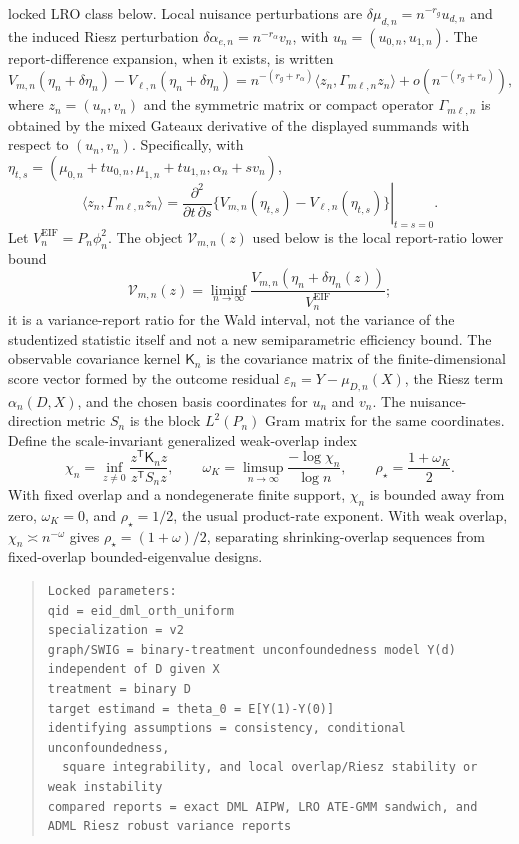 \documentclass[11pt]{article}
\newcommand{\transpose}{\mathsf{T}}
\theoremstyle{definition}
\theoremstyle{plain}
\theoremstyle{remark}
\begin{document}
locked LRO class below.  Local nuisance perturbations are
\(\delta\mu_{d,n}=n^{-r_g}u_{d,n}\) and the induced Riesz perturbation
\(\delta\alpha_{e,n}=n^{-r_\alpha}v_n\), with
\(u_n=(u_{0,n},u_{1,n})\).  The
report-difference expansion, when it exists, is written
\[
V_{m,n}(\eta_n+\delta\eta_n)-V_{\ell,n}(\eta_n+\delta\eta_n)
= n^{-(r_g+r_\alpha)}
  \langle z_n,\Gamma_{m\ell,n}z_n\rangle + o(n^{-(r_g+r_\alpha)}),
\]
where \(z_n=(u_n,v_n)\) and the symmetric matrix or compact operator
\(\Gamma_{m\ell,n}\) is obtained by the mixed Gateaux derivative of the
displayed summands with respect to \((u_n,v_n)\).  Specifically, with
\(\eta_{t,s}=(\mu_{0,n}+tu_{0,n},\mu_{1,n}+tu_{1,n},
\alpha_n+sv_n)\),
\[
\langle z_n,\Gamma_{m\ell,n}z_n\rangle
=\left.
\frac{\partial^2}{\partial t\,\partial s}
\{V_{m,n}(\eta_{t,s})-V_{\ell,n}(\eta_{t,s})\}
\right|_{t=s=0}.
\]
Let \(V^{\mathrm{EIF}}_n=P_n\phi_n^2\).  The object
\(\mathcal V_{m,n}(z)\) used below is the local report-ratio lower bound
\[
\mathcal V_{m,n}(z)
=\liminf_{n\to\infty}
\frac{V_{m,n}(\eta_n+\delta\eta_n(z))}{V^{\mathrm{EIF}}_n};
\]
it is a variance-report ratio for the Wald interval, not the variance of the
studentized statistic itself and not a new semiparametric efficiency bound.
The observable covariance kernel \(\mathsf K_n\) is the covariance matrix of the
finite-dimensional score vector formed by the outcome residual
\(\varepsilon_n=Y-\mu_{D,n}(X)\), the Riesz term \(\alpha_n(D,X)\), and the
chosen basis coordinates for \(u_n\) and \(v_n\).  The nuisance-direction
metric \(S_n\) is the block \(L^2(P_n)\) Gram matrix for the same coordinates.
Define the scale-invariant generalized weak-overlap index
\[
\chi_n=\inf_{z\ne 0}\frac{z^{\transpose}\mathsf K_nz}{z^{\transpose}S_nz},
\qquad
\omega_K=\limsup_{n\to\infty}\frac{-\log \chi_n}{\log n},
\qquad
\rho_\star=\frac{1+\omega_K}{2}.
\]
With fixed overlap and a nondegenerate finite support, \(\chi_n\) is bounded
away from zero, \(\omega_K=0\), and \(\rho_\star=1/2\), the usual
product-rate exponent.  With weak overlap, \(\chi_n\asymp n^{-\omega}\) gives
\(\rho_\star=(1+\omega)/2\), separating shrinking-overlap sequences from
fixed-overlap bounded-eigenvalue designs.

\begin{quote}
\begin{verbatim}
Locked parameters:
qid = eid_dml_orth_uniform
specialization = v2
graph/SWIG = binary-treatment unconfoundedness model Y(d) independent of D given X
treatment = binary D
target estimand = theta_0 = E[Y(1)-Y(0)]
identifying assumptions = consistency, conditional unconfoundedness,
  square integrability, and local overlap/Riesz stability or weak instability
compared reports = exact DML AIPW, LRO ATE-GMM sandwich, and ADML Riesz robust variance reports
\end{verbatim}
\end{quote}
\end{document}
